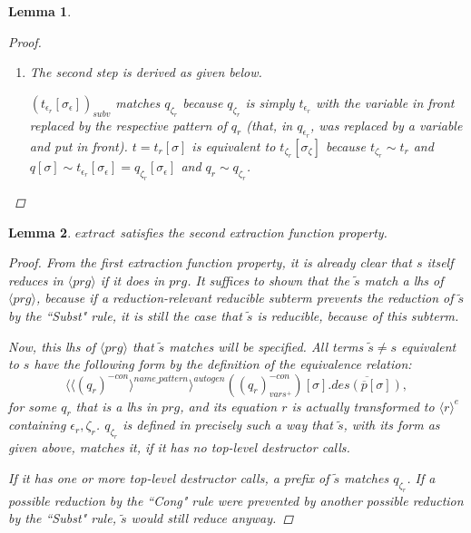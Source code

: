 \documentclass[11pt]{article} %
\newtheorem*{lemma*}{Lemma}
\begin{document}
\begin{lemma*}
\begin{proof}
\begin{enumerate}
\item The second step is derived as given below.
\begin{prooftree}
\end{prooftree}
$(t_{\epsilon_r}[\sigma_\epsilon])_{subv}$ matches $q_{\zeta_r}$ because $q_{\zeta_r}$ is simply $t_{\epsilon_r}$ with the variable in front replaced by the respective pattern of $q_r$ (that, in $q_{\epsilon_r}$, was replaced by a variable and put in front). $t = t_r[\sigma]$ is equivalent to $t_{\zeta_r}[\sigma_\zeta]$ because $t_{\zeta_r} \sim t_r$ and $q[\sigma] \sim t_{\epsilon_r}[\sigma_\epsilon] = q_{\zeta_r}[\sigma_\epsilon]$ and $q_r \sim q_{\zeta_r}$.

\end{enumerate}

\end{proof}

\end{lemma*}

\begin{lemma*}

$extract$ satisfies the second extraction function property.

\begin{proof}

From the first extraction function property, it is already clear that $s$ itself reduces in $\langle prg \rangle$ if it does in $prg$. It suffices to shown that the $\widetilde{s}$ match a lhs of $\langle prg \rangle$, because if a reduction-relevant reducible subterm prevents the reduction of $\widetilde{s}$ by the ``Subst" rule, it is still the case that $\widetilde{s}$ is reducible, because of this subterm.

Now, this lhs of $\langle prg \rangle$ that $\widetilde{s}$ matches will be specified. All terms $\widetilde{s} \neq s$ equivalent to $s$ have the following form by the definition of the equivalence relation:
\begin{equation*}
\langle \langle (q_r)^{-con} \rangle^{name\_pattern} \rangle^{autogen}((q_r)^{-con}_{vars^+})[\sigma].\overline{des(\overline{p}[\sigma])},
\end{equation*}
for some $q_r$ that is a lhs in $prg$, and its equation $r$ is actually transformed to $\langle r \rangle^e$ containing $\epsilon_r, \zeta_r$. $q_{\zeta_r}$ is defined in precisely such a way that $\widetilde{s}$, with its form as given above, matches it, if it has no top-level destructor calls.

If it has one or more top-level destructor calls, a prefix of $\widetilde{s}$ matches $q_{\zeta_r}$. If a possible reduction by the ``Cong" rule were prevented by another possible reduction by the ``Subst" rule, $\widetilde{s}$ would still reduce anyway.

\end{proof}

\end{lemma*}
\end{document}
